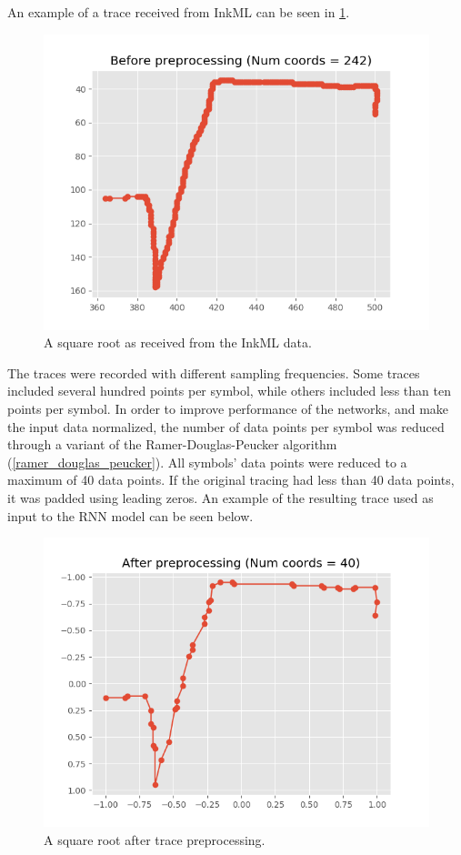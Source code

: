 An example of a trace received from InkML can be seen in \ref{fig:sqrt_not_processed}.
\begin{figure}[H]
    \centering
    \includegraphics[width=\linewidth,keepaspectratio]{Assets/Chapter3_Method/sqrt_before_preprocessing.png}
    \caption{A square root as received from the InkML data.}
    \label{fig:sqrt_not_processed}
\end{figure}

The traces were recorded with different sampling frequencies. Some traces included several hundred points per symbol, while others included less than ten points per symbol. In order to improve performance of the networks, and make the input data normalized, the number of data points per symbol was reduced through a variant of the Ramer-Douglas-Peucker algorithm (\ref{ramer_douglas_peucker}). All symbols' data points were reduced to a maximum of 40 data points. If the original tracing had less than 40 data points, it was padded using leading zeros. An example of the resulting trace used as input to the RNN model can be seen below.

\begin{figure}[H]
    \centering
    \includegraphics[width=\linewidth,keepaspectratio]{Assets/Chapter3_Method/sqrt_after_preprocessing.png}
    \caption{A square root after trace preprocessing.}
    \label{fig:sqrt_processed}
\end{figure}

